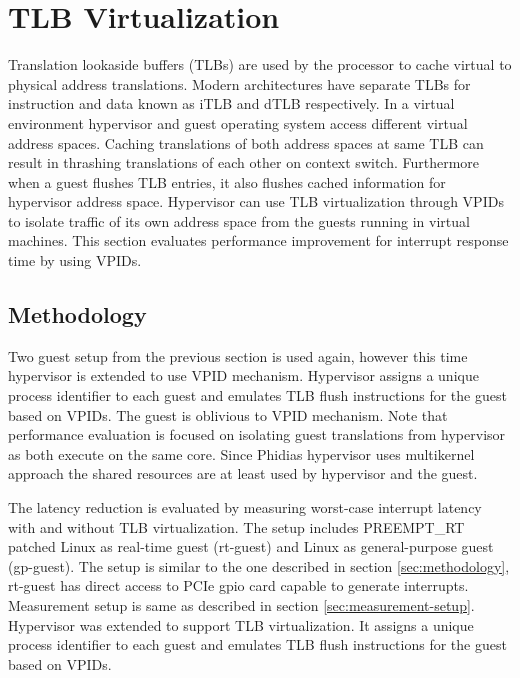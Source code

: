 \section{TLB Virtualization} \label{sec:vtlb-latency-red}
Translation lookaside buffers (TLBs) are used by the processor to cache virtual to physical address translations.
Modern architectures have  separate TLBs for instruction and data known as iTLB and dTLB respectively. 
In a virtual environment hypervisor and guest operating system access different virtual address spaces.
Caching translations of both address spaces at same TLB can result in thrashing translations of each other on context switch. 
Furthermore when a guest flushes TLB entries, it also flushes cached information for hypervisor address space.
Hypervisor can use TLB virtualization through VPIDs to isolate traffic of its own address space from the guests running in virtual machines.
This section evaluates performance improvement for interrupt response time by using VPIDs.

\subsection{Methodology}
Two guest setup from the previous section is used again, however this time hypervisor is extended to use VPID mechanism.
Hypervisor assigns a unique process identifier to each guest and emulates TLB flush instructions for the guest 
based on VPIDs. The guest is oblivious to VPID mechanism.
Note that performance evaluation is focused on isolating guest translations from hypervisor as both execute on the same core.
Since Phidias hypervisor uses multikernel approach the shared resources are at least used by hypervisor and the guest.

The latency reduction is evaluated by measuring worst-case interrupt latency with and without TLB virtualization.
The setup includes PREEMPT\_RT patched Linux as real-time guest (rt-guest)
and Linux as general-purpose guest (gp-guest). 
The setup is similar to the one described in section \ref{sec:methodology}, rt-guest has direct access to PCIe gpio card capable to generate interrupts. 
Measurement setup is same as described in section \ref{sec:measurement-setup}.
Hypervisor was extended to support TLB virtualization. 
It assigns a unique process identifier to each guest and emulates TLB flush instructions for the guest based on VPIDs.

